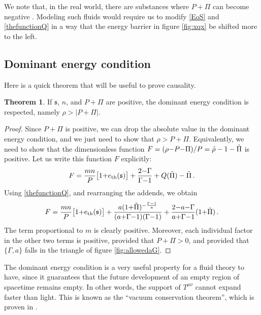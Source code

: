 \documentclass[a4paper, amsfonts, amssymb, amsmath, reprint, showkeys, nofootinbib, twoside,notitlepage,onecolumn]{revtex4-2}
\newcommand{\s}{{\mathfrak{s}}}
\theoremstyle{definition}
\theoremstyle{theorem}
\newtheorem{theorem}{Theorem}
\theoremstyle{corollary}
\begin{document}
We note that, in the real world, there are substances where  $P{+}\Pi$ can become negative \cite{RajagopalCavitation2009yw,HabichCaviation2014tpa,ByresCaviaiton2020}. Modeling such fluids would require us to modify \eqref{EoS} and \eqref{thefunctionQ} in a way that the energy barrier in figure \ref{fig:xqx} be shifted more to the left.


\subsection{Dominant energy condition}

Here is a quick theorem that will be useful to prove causality.
\begin{theorem}\label{Theo2}
If $\s$, $n$, and $P{+}\Pi$ are positive, the dominant energy condition is respected, namely $\rho >|P{+}\Pi|$.
\end{theorem}
\begin{proof}
Since $P{+}\Pi$ is positive, we can drop the absolute value in the dominant energy condition, and we just need to show that $\rho>P{+}\Pi$. Equivalently, we need to show that the dimensionless function $F=(\rho{-}P{-}\Pi)/P=\Tilde{\rho}-1-\Tilde{\Pi}$ is positive. Let us write this function $F$ explicitly:
\begin{equation}
F= \dfrac{mn}{P}\big[1{+}e_\text{th}(\s) \big]+  \dfrac{2{-}\Gamma}{\Gamma{-}1} + Q(\Tilde{\Pi})-\Tilde{\Pi} \, .
\end{equation}
Using \eqref{thefunctionQ}, and rearranging the addends, we obtain
\begin{equation}
F= \dfrac{mn}{P}\big[1{+}e_\text{th}(\s) \big]+\dfrac{a(1{+}\Tilde{\Pi})^{-\frac{\Gamma{-}1}{a}}}{(a{+}\Gamma{-}1)(\Gamma{-}1)} +\dfrac{2{-}a{-}\Gamma}{a{+}\Gamma{-}1}(1{+}\Tilde{\Pi}) \, .
\end{equation}
The term proportional to $m$ is clearly positive. Moreover, each individual factor in the other two terms is positive, provided that $P+\Pi>0$, and provided that $\{\Gamma,a \}$ falls in the triangle of figure \ref{fig:allowedaG}.
\end{proof}
The dominant energy condition is a very useful property for a fluid theory to have, since it guarantees that the future development of an empty region of spacetime remains empty. In other words, the support of $T^{\mu \nu}$ cannot expand faster than light. This is known as the ``vacuum conservation theorem'', which is proven in \cite[\S 4.3]{HawkingEllis1973uf}.
\end{document}

